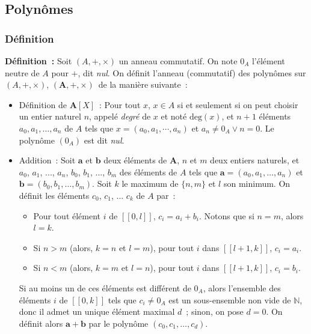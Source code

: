 \subsection{Polynômes}

\subsubsection{Définition} 

\noindent\textbf{Définition :} Soit $(A, +, \times)$ un anneau commutatif. 
    On note $0_A$ l'élément neutre de $A$ pour $+$, dit \textit{nul}.
    On définit l'anneau (commutatif) des polynômes sur $(A, +, \times)$, $(\mathbf{A}, +, \times)$ de la manière suivante : 
    \begin{itemize}[nosep]
        \item Définition de $\mathbf{A}[X]$ : Pour tout $x$, $x \in A$ si et seulement si on peut choisir un entier naturel $n$, appelé \textit{degré} de $x$ et noté $\mathrm{deg}(x)$, et $n+1$ éléments $a_0, a_1, \dots, a_n$ de $A$ tels que $x = (a_0, a_1, \cdots, a_n)$ et $a_n \neq 0_A \vee n = 0$.
            Le polynôme $(0_A)$ est dit \textit{nul}.
        \item Addition : Soit $\mathbf{a}$ et $\mathbf{b}$ deux éléments de $\mathbf{A}$, $n$ et $m$ deux entiers naturels, et $a_0$, $a_1$, ..., $a_n$, $b_0$, $b_1$, ..., $b_m$ des éléments de $A$ tels que $\mathbf{a} = (a_0, a_1, \dots, a_n)$ et $\mathbf{b} = (b_0, b_1, \dots, b_m)$.
            Soit $k$ le maximum de $\lbrace n, m \rbrace$ et $l$ son minimum.
            On définit les éléments $c_0$, $c_1$, ... $c_k$ de $A$ par : 
            \begin{itemize}[nosep]
                \item Pour tout élément $i$ de $[\![0, l]\!]$, $c_i = a_i + b_i$.
                    Notons que si $n = m$, alors $l = k$.
                \item Si $n > m$ (alors, $k = n$ et $l = m$), pour tout $i$ dans $[\![l+1, k]\!]$, $c_i = a_i$.
                \item Si $n < m$ (alors, $k = m$ et $l = n$), pour tout $i$ dans $[\![l+1, k]\!]$, $c_i = b_i$.
            \end{itemize}
            Si au moins un de ces éléments est différent de $0_A$, alors l'ensemble des éléments $i$ de $[\![0, k]\!]$ tels que $c_i \neq 0_A$ est un sous-ensemble non vide de $\mathbb{N}$, donc il admet un unique élément maximal $d$ ; sinon, on pose $d = 0$.
            On définit alors $\mathbf{a} + \mathbf{b}$ par le polynôme $(c_0, c_1, \dots, c_d)$.

\end{itemize}
